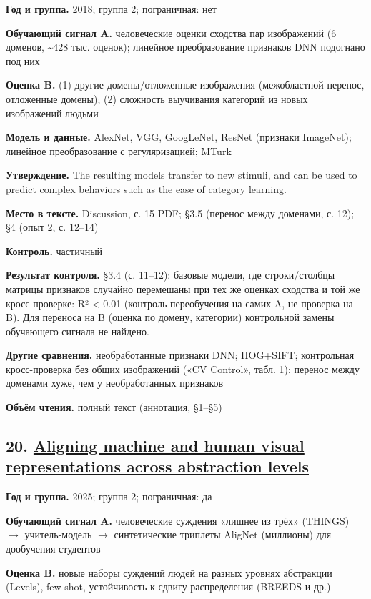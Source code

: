 \textbf{Год и группа.} 2018; группа 2; пограничная: нет

\textbf{Обучающий сигнал A.} человеческие оценки сходства пар изображений (6 доменов, \textasciitilde{}428 тыс. оценок); линейное преобразование признаков DNN подогнано под них

\textbf{Оценка B.} (1) другие домены/отложенные изображения (межобластной перенос, отложенные домены); (2) сложность выучивания категорий из новых изображений людьми

\textbf{Модель и данные.} AlexNet, VGG, GoogLeNet, ResNet (признаки ImageNet); линейное преобразование с регуляризацией; MTurk

\textbf{Утверждение.} The resulting models transfer to new stimuli, and can be used to predict complex behaviors such as the ease of category learning.

\textbf{Место в тексте.} Discussion, с. 15 PDF; §3.5 (перенос между доменами, с. 12); §4 (опыт 2, с. 12–14)

\textbf{Контроль.} частичный

\textbf{Результат контроля.} §3.4 (с. 11–12): базовые модели, где строки/столбцы матрицы признаков случайно перемешаны при тех же оценках сходства и той же кросс-проверке: R² < 0.01 (контроль переобучения на самих A, не проверка на B). Для переноса на B (оценка по домену, категории) контрольной замены обучающего сигнала не найдено.

\textbf{Другие сравнения.} необработанные признаки DNN; HOG+SIFT; контрольная кросс-проверка без общих изображений («CV Control», табл. 1); перенос между доменами хуже, чем у необработанных признаков

\textbf{Объём чтения.} полный текст (аннотация, §1–§5)


\subsection*{20. \href{https://doi.org/10.1038/s41586-025-09631-6}{Aligning machine and human visual representations across abstraction levels}}

\textbf{Год и группа.} 2025; группа 2; пограничная: да

\textbf{Обучающий сигнал A.} человеческие суждения «лишнее из трёх» (THINGS) $\rightarrow$ учитель-модель $\rightarrow$ синтетические триплеты AligNet (миллионы) для дообучения студентов

\textbf{Оценка B.} новые наборы суждений людей на разных уровнях абстракции (Levels), few-shot, устойчивость к сдвигу распределения (BREEDS и др.)

